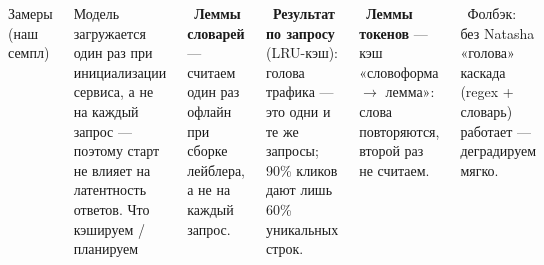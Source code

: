 \begin{frame}[t]
\vspace{8pt}\par
\begin{columns}[T]
{\InterSemi\fontsize{8.5}{10.5}\selectfont Замеры (наш семпл)}\par\vspace{5pt}
\par\vspace{5pt}
{\smalltext\color{mvgray} Модель загружается один раз при инициализации сервиса, а не на каждый запрос — поэтому старт не влияет на латентность ответов.}
{\InterSemi\fontsize{8.5}{10.5}\selectfont Что кэшируем / планируем}\par\vspace{6pt}
{\smalltext
{}\ \textbf{Леммы словарей} — считаем один раз офлайн при сборке лейблера, а не на каждый запрос.\par\vspace{5pt}
\ \textbf{Результат по запросу} (LRU-кэш): голова трафика — это одни и те же запросы; 90\% кликов дают лишь 60\% уникальных строк.\par\vspace{5pt}
\ \textbf{Леммы токенов} — кэш «словоформа $\to$ лемма»: слова повторяются, второй раз не считаем.\par\vspace{4pt}
\ Фолбэк: без Natasha «голова» каскада (regex + словарь) работает — деградируем мягко.}
\end{columns}
\slidefoot
\end{frame}
